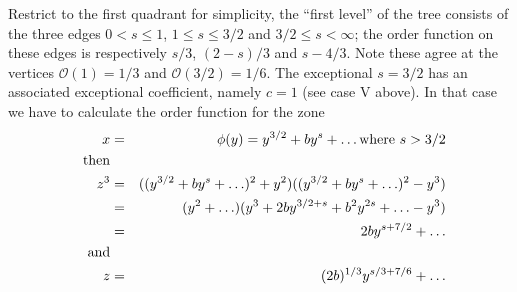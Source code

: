\documentclass[article]{amsart}
\newcommand{\0}{{\bf 0}}
\begin{document}
%
%
%
%
%
% 
%


Restrict to the first quadrant for simplicity, the ``first level'' of the tree consists of the three edges $0<s\le 1$, $1\le s\le 3/2$ and $3/2 \le s<\infty$; the order function on these edges is respectively $s/3$, $(2-s)/3$ and $s-4/3$. Note these agree at the vertices $\mathcal{O}(1)=1/3$ and $\mathcal{O}(3/2)=1/6$. The exceptional $s=3/2$ has an associated exceptional coefficient, namely $c=1$ (see case V above). In that case we have to calculate the order function for the zone
\begin{eqnarray*}
x&=& \phi(y) = y^{3/2} + by^s + \ldots {\rm where}\ s > 3/2\\
\ \ {\rm then} &&\\ 
z^3 &=& ((y^{3/2} + by^s +\ldots)^2 + y^2)((y^{3/2} + by^s+\ldots)^2 - y^3)\\
&=& (y^2 + \ldots)(y^3 + 2by^{3/2 + s} + b^2y^{2s} + \ldots -y^3)\\
&=& 2by^{s + 7/2} + \ldots\\ 
\ \ {\rm and} &&\\
z&=& (2b)^{1/3}y^{s/3 +7/6}+ \ldots
\end{eqnarray*} 
\end{document}
